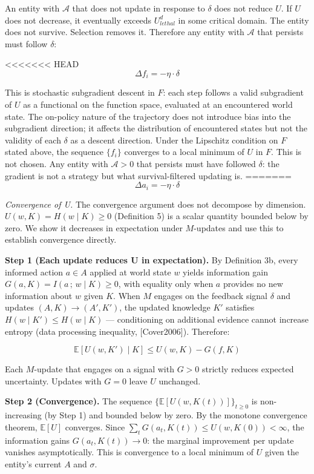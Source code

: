 \documentclass[
]{article}
\begin{document}
An entity with \(\mathcal{A}\) that does not update in response to
\(\delta\) does not reduce \(U\). If \(U\) does not decrease, it
eventually exceeds \(U_{lethal}^d\) in some critical domain. The entity
does not survive. Selection removes it. Therefore any entity with
\(\mathcal{A}\) that persists must follow \(\delta\):

<<<<<<< HEAD
\[\Delta f_i = -\eta \cdot \delta\]

This is stochastic subgradient descent in \(F\): each step follows a
valid subgradient of \(U\) as a functional on the function space,
evaluated at an encountered world state. The on-policy nature of the
trajectory does not introduce bias into the subgradient direction; it
affects the distribution of encountered states but not the validity of
each \(\delta\) as a descent direction. Under the Lipschitz condition on
\(F\) stated above, the sequence \(\{f_i\}\) converges to a local
minimum of \(U\) in \(F\). This is not chosen. Any entity with
\(\mathcal{A} > 0\) that persists must have followed \(\delta\): the
gradient is not a strategy but what survival-filtered updating is.
=======
\[\Delta a_i = -\eta \cdot \delta\]

\emph{Convergence of U.} The convergence argument does not decompose
by dimension. \(U(w, K) = H(w \mid K) \geq 0\) (Definition 5) is a
scalar quantity bounded below by zero. We show it decreases in
expectation under \(M\)-updates and use this to establish convergence
directly.

\textbf{Step 1 (Each update reduces U in expectation).} By Definition
3b, every informed action \(a \in A\) applied at world state \(w\) yields
information gain \(G(a, K) = I(a\,;\,w \mid K) \geq 0\), with equality
only when \(a\) provides no new information about \(w\) given \(K\).
When \(M\) engages on the feedback signal \(\delta\) and updates
\((A, K) \to (A', K')\), the updated knowledge \(K'\) satisfies
\(H(w \mid K') \leq H(w \mid K)\) --- conditioning on additional
evidence cannot increase entropy (data processing inequality,
{[}Cover2006{]}). Therefore:

\[\mathbb{E}[U(w, K') \mid K] \leq U(w, K) - G(f, K)\]

Each \(M\)-update that engages on a signal with \(G > 0\) strictly
reduces expected uncertainty. Updates with \(G = 0\) leave \(U\)
unchanged.

\textbf{Step 2 (Convergence).} The sequence
\(\{\mathbb{E}[U(w, K(t))]\}_{t \geq 0}\) is non-increasing (by Step 1)
and bounded below by zero. By the monotone convergence theorem,
\(\mathbb{E}[U]\) converges. Since
\(\sum_t G(a_t, K(t)) \leq U(w, K(0)) < \infty\), the information gains
\(G(a_t, K(t)) \to 0\): the marginal improvement per update vanishes
asymptotically. This is convergence to a local minimum of \(U\) given
the entity's current \(A\) and \(\sigma\).
\end{document}

